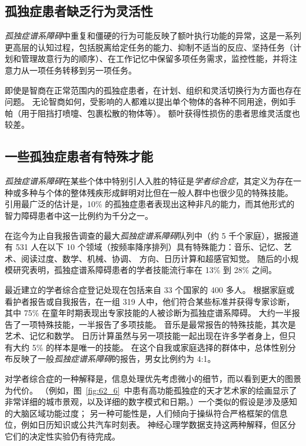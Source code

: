 \subsection{孤独症患者缺乏行为灵活性}

\textit{孤独症谱系障碍}中重复和僵硬的行为可能反映了额叶执行功能的异常，这是一系列更高层的认知过程，包括脱离给定任务的能力、抑制不适当的反应、坚持任务（计划和管理故意行为的顺序）、在工作记忆中保留多项任务需求，监控性能，并将注意力从一项任务转移到另一项任务。


即使是智商在正常范围内的孤独症患者，在计划、组织和灵活切换行为方面也存在问题。
无论智商如何，受影响的人都难以提出单个物体的各种不同用途，例如手帕（用于阻挡打喷嚏、包裹松散的物体等）。
额叶获得性损伤的患者思维灵活度也较差。



\subsection{一些孤独症患者有特殊才能}

\textit{孤独症谱系障碍}在某些个体中特别引人入胜的特征是\textit{学者综合症}，其定义为存在一种或多种与个体的整体残疾形成鲜明对比但在一般人群中也很少见的特殊技能。
引用最广泛的估计是，10\% 的孤独症患者表现出这种非凡的能力，而其他形式的智力障碍患者中这一比例约为千分之一。


在迄今为止自我报告调查的最大\textit{孤独症谱系障碍}队列中（约 5 千个家庭），据报道有 531 人在以下 10 个领域（按频率降序排列）具有特殊能力：音乐、记忆、艺术、阅读过度、数学、机械、协调、 方向、日历计算和超感官知觉。
随后的小规模研究表明，孤独症谱系障碍患者的学者技能流行率在 13\% 到 28\% 之间。


最近建立的学者综合症登记处现在包括来自 33 个国家的 400 多人。
根据家庭或看护者报告或自我报告，在一组 319 人中，他们符合某些标准并获得专家诊断，其中 75\% 在童年时期表现出专家技能的人被诊断为孤独症谱系障碍。
大约一半报告了一项特殊技能，一半报告了多项技能。
音乐是最常报告的特殊技能，其次是艺术、记忆和数学。
日历计算虽然与另一项技能一起出现在许多学者身上，但只有大约 5\% 的样本是唯一的技能。
在这个自我或家庭选择的群体中，总体性别分布反映了一般\textit{孤独症谱系障碍}的报告，男女比例约为 4:1。


对学者综合症的一种解释是，信息处理优先考虑微小的细节，而以看到更大的图景为代价。
（例如，图~\ref{fig:62_6}~中患有高功能孤独症的天才艺术家的绘画显示了非常详细的城市景观，以及详细的数字模式和日期。）一个类似的假设是涉及感知的大脑区域功能过度；
另一种可能性是，人们倾向于操纵符合严格框架的信息位，例如日历知识或公共汽车时刻表。
神经心理学数据支持这两种解释，但区分它们的决定性实验仍有待完成。


